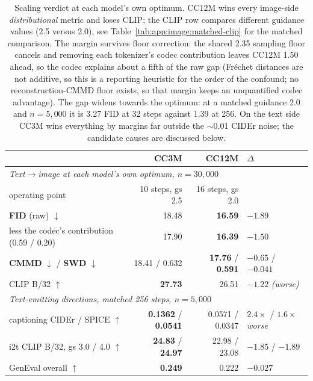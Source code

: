 \begin{table}[tb]
\centering
\small
\begin{tabular}{lrrl}
\toprule
& \textbf{CC3M} & \textbf{CC12M} & $\Delta$ \\
\midrule
\multicolumn{4}{l}{\emph{Text$\rightarrow$image at each model's own optimum, $n{=}30{,}000$}}\\
operating point & 10 steps, gs 2.5 & 16 steps, gs 2.0 & \\
\textbf{FID} (raw) $\downarrow$ & 18.48 & \textbf{16.59} & $-1.89$ \\
\quad less the codec's contribution (0.59 / 0.20) & 17.90 & \textbf{16.39} & $\mathbf{-1.50}$ \\
\textbf{CMMD} $\downarrow$ / \textbf{SWD} $\downarrow$ & 18.41 / 0.632 & \textbf{17.76} / \textbf{0.591} & $-0.65$ / $-0.041$ \\
CLIP B/32 $\uparrow$ & \textbf{27.73} & 26.51 & $-1.22$ \emph{(worse)} \\
\midrule
\multicolumn{4}{l}{\emph{Text-emitting directions, matched 256 steps, $n{=}5{,}000$}}\\
captioning CIDEr / SPICE $\uparrow$ & \textbf{0.1362} / \textbf{0.0541} & 0.0571 / 0.0347 & $2.4\times$ / $1.6\times$ \emph{worse} \\
i2t CLIP B/32, gs 3.0 / 4.0 $\uparrow$ & \textbf{24.83} / \textbf{24.97} & 22.98 / 23.08 & $-1.85$ / $-1.89$ \\
GenEval overall $\uparrow$ & \textbf{0.249} & 0.222 & $-0.027$ \\
\bottomrule
\end{tabular}
\caption{Scaling verdict at each model's own optimum. CC12M wins every image-side
\emph{distributional} metric and loses CLIP; the CLIP row compares different guidance values
(2.5 versus 2.0), see Table~\ref{tab:app:image:matched-clip} for the matched comparison. The margin survives floor correction: the shared 2.35 sampling floor cancels and removing each
tokenizer's codec contribution leaves CC12M 1.50 ahead, so the codec explains about a fifth of the
raw gap (Fr\'echet distances are not additive, so this is a reporting heuristic for the order of
the confound; no reconstruction-CMMD floor exists, so that margin keeps an unquantified codec
advantage). The gap widens towards the optimum: at a matched guidance 2.0 and $n{=}5{,}000$ it is 3.27 FID at
32 steps against 1.39 at 256. On the text side CC3M wins everything by margins far outside the $\sim$0.01 CIDEr noise; the
candidate causes are discussed below.}
\label{tab:app:image:scaling-verdict}
\end{table}

